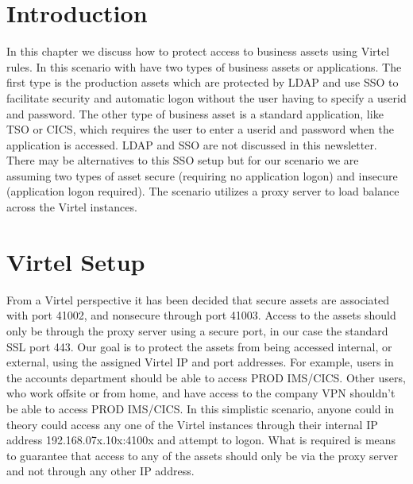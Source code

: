 \documentclass[letterpaper,10pt,english]{sphinxmanual}
\begin{document}
\section{Introduction}
\label{\detokenize{connectivity_guide:id76}}
\sphinxAtStartPar
In this chapter we discuss how to protect access to business assets using Virtel rules. In this scenario with have two types of business assets or applications. The first type is the production assets which are protected by LDAP and use SSO to facilitate security and automatic logon without the user having to specify a userid and password. The other type of business asset is a standard application, like TSO or CICS, which requires the user to enter a userid and password when the application is accessed. LDAP and SSO are not discussed in this newsletter. There may be alternatives to this SSO setup but for our scenario we are assuming two types of asset \textendash{} secure (requiring no application logon) and insecure (application logon required). The scenario utilizes a proxy server to load balance across the Virtel instances.

\sphinxAtStartPar
{}

\newpage

\ignorespaces 

\section{Virtel Setup}
\label{\detokenize{connectivity_guide:virtel-setup}}\label{\detokenize{connectivity_guide:index-188}}
\sphinxAtStartPar
From a Virtel perspective it has been decided that secure assets are associated with port 41002, and non\sphinxhyphen{}secure through port 41003. Access to the assets should only be through the proxy server using a secure port, in our case the standard SSL port 443. Our goal is to protect the assets from being accessed internal, or external, using the assigned Virtel IP
and port addresses. For example, users in the accounts department should be able to access PROD IMS/CICS. Other users, who work offsite or from home, and have access to the company VPN shouldn’t be able to access PROD IMS/CICS. In this simplistic scenario, anyone could in theory could access any one of the Virtel instances through their internal IP address \textendash{} 192.168.07x.10x:4100x and attempt to logon. What is required is means to guarantee that access to any of the assets should only be via the proxy server and not through any other IP address.
\end{document}
